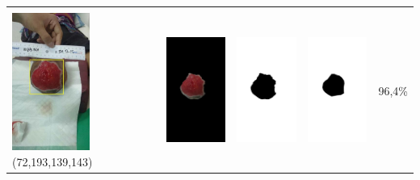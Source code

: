 \begin{table}[H]
\begin{tabular}{|m{1.0in}|m{1.0in}|m{1.0in}|m{1.0in}|m{0.6in}|}
		&  &  & \\
		\includegraphics[width=1.0in]{gambar/hasil_segmentasi/luka_merah/image_9_rect.jpg} {\centering\fontsize{10}{10}\selectfont(72,193,139,143)}&
		\includegraphics[width=1.0in]{gambar/hasil_segmentasi/luka_merah/result_9.jpg}&
		\includegraphics[width=1.0in]{gambar/hasil_segmentasi/luka_merah/mask_r_9.jpg}&
		\includegraphics[width=1.0in]{gambar/hasil_segmentasi/luka_merah/9_r.jpg}&
		96,4\% \\
		\hline


\end{tabular}
\end{table}
